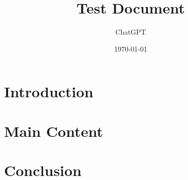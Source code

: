 \documentclass{article}
\begin{document}
\title{Test Document}
\author{ChatGPT}
\date{\today}
\maketitle
\section{Introduction}
\lipsum[1]
\section{Main Content}
\lipsum[2-4]
\section{Conclusion}
\lipsum[5]
\end{document}
